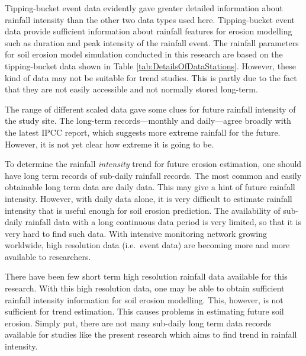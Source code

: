 

Tipping-bucket event data evidently gave greater detailed information about
rainfall intensity than the other two data types used here. Tipping-bucket event
data provide sufficient information about rainfall features for erosion
modelling such as duration and peak intensity of the rainfall event. The
rainfall parameters for soil erosion model simulation conducted in this research
are based on the tipping-bucket data shown in Table
\ref{tab:DetailsOfDataStations}. However, these kind of data may not be suitable
for trend studies.  This is partly due to the fact that they are not easily
accessible and not normally stored long-term.

The range of different scaled data gave some clues for future rainfall intensity
of the study site. The long-term records---monthly and daily---agree broadly
with the latest IPCC report, which suggests more extreme rainfall for the
future. However, it is not yet clear how extreme it is going to be.

To determine the rainfall \emph{intensity} trend for future erosion estimation,
one should have long term records of sub-daily rainfall records. The most common
and easily obtainable long term data are daily data. This may give a hint of
future rainfall intensity. However, with daily data alone, it is very difficult
to estimate rainfall intensity that is useful enough for soil erosion
prediction. The availability of sub-daily rainfall data with a long continuous
data period is very limited, so that it is very hard to find such data.
With intensive monitoring network growing worldwide, high resolution data (i.e.\
event data) are becoming more and more available to researchers.

There have been few short term high resolution rainfall data available for this
research. With this high resolution data, one may be able to obtain sufficient
rainfall intensity information for soil erosion modelling. This, however, is not
sufficient for trend estimation. This causes problems in estimating future soil
erosion. Simply put, there are not many sub-daily long term data records
available for studies like the present research which aims to find trend in
rainfall intensity.

